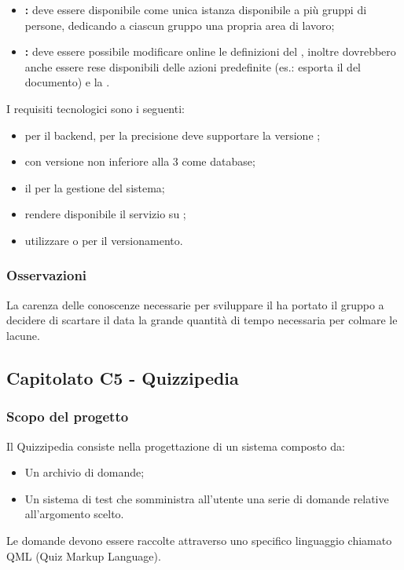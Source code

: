 \begin{itemize}
	\item \textbf{:} deve essere disponibile come unica istanza disponibile a più gruppi di persone, dedicando a ciascun gruppo una propria area di lavoro;
	\item \textbf{:} deve essere possibile modificare online le definizioni del , inoltre dovrebbero anche essere rese disponibili delle azioni predefinite (es.: esporta il  del documento)
	e la .
\end{itemize}

I  requisiti tecnologici sono i seguenti:
\begin{itemize}
	\item {} per il backend, per la precisione deve supportare la versione  ;
	\item {} con versione non inferiore alla 3 come database;
	\item il   per la gestione del sistema;
	\item rendere disponibile il servizio su ;
	\item utilizzare  o  per il versionamento.
\end{itemize}

\subsubsection{Osservazioni}
La carenza delle conoscenze necessarie per sviluppare il  ha portato il gruppo a decidere di scartare il  data la grande quantità di tempo necessaria per colmare le lacune.


\subsection{Capitolato C5 - Quizzipedia}
\subsubsection{Scopo del progetto}

Il  Quizzipedia consiste nella progettazione di un sistema composto da:
\begin{itemize}
	\item Un archivio di domande;
	\item Un sistema di test che somministra all'utente una serie di domande relative all'argomento scelto.
\end{itemize}
Le domande devono essere raccolte attraverso uno specifico linguaggio chiamato QML (Quiz Markup Language).

